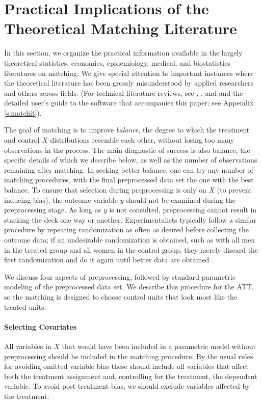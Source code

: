 \documentclass[11pt,titlepage]{article}
\begin{document}
\section{Practical Implications of the Theoretical Matching
  Literature}
\label{s:choose}

In this section, we organize the practical information available in
the largely theoretical statistics, economics, epidemiology, medical,
and biostatistics literatures on matching.  We give special attention
to important instances where the theoretical literature has been
grossly misunderstood by applied researchers and others across fields.
(For technical literature reviews, see \citet{Imbens04},
\citet{Rosenbaum02}, and \citet{Stuart04} and the detailed user's
guide to the software that accompanies this paper; see Appendix
\ref{s:matchit}).

The goal of matching is to improve \emph{balance}, the degree to which
the treatment and control $X$ distributions resemble each other,
without losing too many observations in the process.  The main
diagnostic of success is also balance, the specific details of which
we describe below, as well as the number of observations remaining
after matching.  In seeking better balance, one can try any number of
matching procedures, with the final preprocessed data set the one with
the best balance.  To ensure that selection during preprocessing is
only on $X$ (to prevent inducing bias), the outcome variable $y$
should not be examined during the preprocessing stage.  As long as $y$
is not consulted, preprocessing cannot result in stacking the deck one
way or another.  Experimentalists typically follow a similar procedure
by repeating randomization as often as desired before collecting the
outcome data; if an undesirable randomization is obtained, such as
with all men in the treated group and all women in the control group,
they merely discard the first randomization and do it again until
better data are obtained \citep[see][]{Rubin01}.

We discuss four aspects of preprocessing, followed by standard
parametric modeling of the preprocessed data set.  We describe this
procedure for the ATT, so the matching is designed to choose control
units that look most like the treated units.

\paragraph{Selecting Covariates}
All variables in $X$ that would have been included in a parametric
model without preprocessing should be included in the matching
procedure.  By the usual rules for avoiding omitted variable bias
these should include all variables that affect both the treatment
assignment and, controlling for the treatment, the dependent variable.
To avoid post-treatment bias, we should exclude variables affected by
the treatment.  
\end{document}
